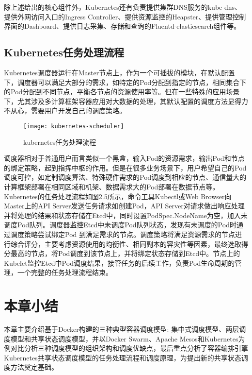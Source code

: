 除上述给出的核心组件外，Kubernetes还有负责提供集群DNS服务的kube-dns、提供外网访问入口的Ingress Controller、提供资源监控的Heapster、提供管理控制界面的Dashboard、提供日志采集、存储和查询的Fluentd-elasticsearch组件等。

\subsection{Kubernetes任务处理流程}
Kubernetes调度器运行在Master节点上，作为一个可插拔的模块，在默认配置下，调度器可以满足大部分的需求，如特定的Pod分配到指定的节点，相同集合下的Pod分配到不同节点，平衡各节点的资源使用率等。但在一些特殊的应用场景下，尤其涉及多计算框架容器应用对大数据的处理，其默认配置的调度方法显得力不从心，需要用户开发自己的调度策略。
\begin{figure}[H] %
	\centering
	\texttt{[image: kubernetes-scheduler]}
	\caption{kubernetes任务处理流程~\cite{KUBdoc}}
\end{figure}
调度器相对于普通用户而言类似一个黑盒，输入Pod的资源需求，输出Pod和节点的绑定策略，起到指挥中枢的作用。但是在很多业务场景下，用户希望自己的Pod调度可控，如定制调度算法、特殊硬件需求的Pod调度到相应的节点、通信量大的计算框架部署在相同区域和机架、数据需求大的Pod部署在数据节点等。Kubernetes的任务处理流程如图2.5所示，命令工具Kubectl或Web Browser向Master上的API Server发送任务请求如创建Pod，API Server对请求做出响应处理并将处理的结果和状态存储在Etcd中，同时设置PodSpec.NodeName为空，加入未调度Pod队列。调度器监控Etcd中未调度Pod队列状态，发现有未调度的Pod时通过调度策略尝试绑定Pod 到满足需求的节点。调度策略将满足资源需求的节点进行综合评分，主要考虑资源使用的均衡性、相同副本的容灾性等因素，最终选取得分最高的节点，将Pod调度到该节点上，并将绑定状态存储到Etcd中。节点上的Kubelet监控Etcd中Pod调度结果，接管任务的后续工作，负责Pod生命周期的管理，一个完整的任务处理流程结束。

\section{本章小结}

本章主要介绍基于Docker构建的三种典型容器调度模型: 集中式调度模型、两层调度模型和共享状态调度模型，并以Docker Swarm、Apache Mesos和Kubernetes为例对比分析三种调度模型的组织架构和调度优缺点，最后重点分析了容器编排引擎Kubernetes共享状态调度模型的任务处理流程和调度原理，为提出新的共享状态调度方法奠定基础。




